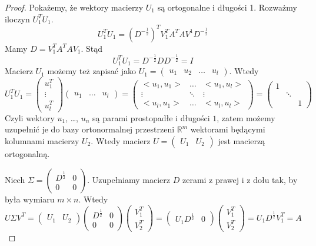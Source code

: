 \documentclass{article}
\theoremstyle{definition}
\begin{document}
\begin{proof}
Pokażemy, że wektory macierzy $U_1$ są ortogonalne i długości 1.
Rozważmy iloczyn $U_1^T U_1$.
$$ U_1^T U_1 = (D^{-\frac{1}{2}})^T V_1^T A^T A V^1 D^{-\frac{1}{2}} $$
Mamy $D =  V_1^T A^TA V_1$. Stąd
$$ U_1^T U_1 = D^{-\frac{1}{2}} D D^{-\frac{1}{2}} = I $$
Macierz $U_1$ możemy też zapisać jako $U_1 = \begin{pmatrix} u_1 & u_2 & \ldots & u_l \end{pmatrix}$.
Wtedy $$ U_1^T U_1 = \begin{pmatrix} u_1^T \\ \vdots \\ u_l^T \end{pmatrix} \begin{pmatrix} u_1 & \ldots & u_l \end{pmatrix} = \begin{pmatrix} <u_1,u_1> & \ldots & <u_1, u_l> \\ \vdots & \ddots & \vdots \\ <u_l, u_1> & \ldots & <u_l, u_l>  \end{pmatrix} = \begin{pmatrix} 1 & & \\ & \ddots & \\ & & 1 \end{pmatrix}$$
Czyli wektory $u_1$, \ldots, $u_n$ są parami prostopadłe i długości $1$, zatem możemy uzupełnić je do bazy ortonormalnej przestrzeni $\mathbb{R}^m$ wektorami będącymi kolumnami macierzy $U_2$. Wtedy macierz $U = \begin{pmatrix} U_1 & U_2 \end{pmatrix} $ jest macierzą ortogonalną.

Niech $\Sigma = \begin{pmatrix} D^{\frac{1}{2}} & 0 \\ 0 & 0 \end{pmatrix}$. Uzupełniamy macierz $D$ zerami z prawej i z dołu tak, by była wymiaru $m \times n$. Wtedy
$$ U \Sigma V^T = \begin{pmatrix} U_1 & U_2 \end{pmatrix} \begin{pmatrix} D^{\frac{1}{2}} & 0 \\ 0 & 0 \end{pmatrix} \begin{pmatrix} V_1^T \\ V_2^T \end{pmatrix} = \begin{pmatrix} U_1 D^{\frac{1}{2}} & 0 \end{pmatrix} \begin{pmatrix} V_1^T \\ V_2^T \end{pmatrix} = U_1 D^{\frac{1}{2}} V_1^T = A $$
\end{proof}
\end{document}
